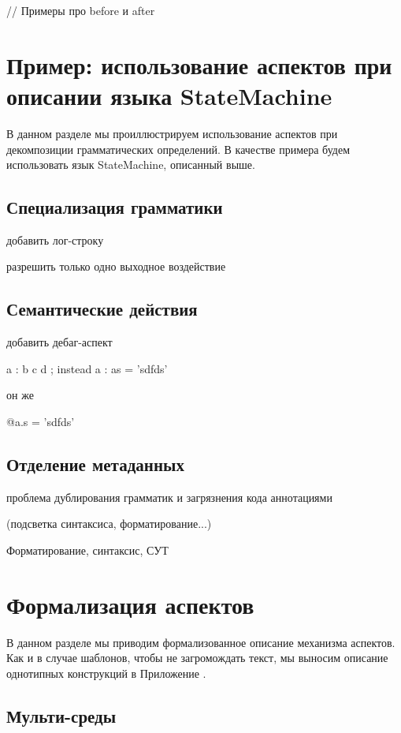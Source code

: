 // Примеры про before и after

\section{Пример: использование аспектов при описании языка StateMachine}

В данном разделе мы проиллюстрируем использование аспектов при декомпозиции грамматических определений. В качестве примера будем использовать язык StateMachine, описанный выше.

\subsection{Специализация грамматики}
добавить лог-строку

разрешить только одно выходное воздействие

\subsection{Семантические действия}

добавить дебаг-аспект

a : b c d ;
	instead a : a{s = 'sdfds'}
	
	он же 
	
	@a.s = 'sdfds'

\subsection{Отделение метаданных}


проблема дублирования грамматик и загрязнения кода аннотациями

(подсветка синтаксиса, форматирование...)

Форматирование, синтаксис, СУТ

\section{Формализация аспектов}

В данном разделе мы приводим формализованное описание механизма аспектов. Как и в случае шаблонов, чтобы не загромождать текст, мы выносим описание однотипных конструкций в Приложение .

\subsection{Мульти-среды}

\newcommand{\ME}{\Upsilon}
\newcommand{\meitem}[2]{\left\{ #1 \mapsto #2 \right\}}
\newcommand{\meempty}{\left\{\right\}}
\newcommand{\mejoin}{\uplus}

